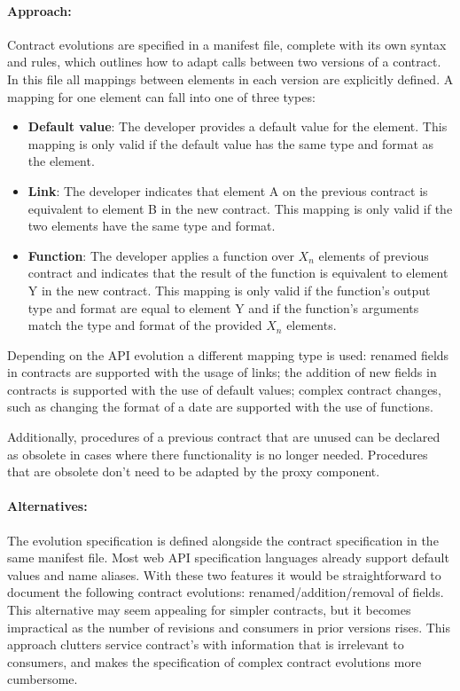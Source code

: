 \paragraph{Approach:}
Contract evolutions are specified in a manifest file, complete with its own syntax and rules,
which outlines how to adapt calls between two versions of a contract.
In this file all mappings between elements in each version are explicitly defined.
A mapping for one element can fall into one of three types:
\begin{itemize}
    \item \textbf{Default value}: The developer provides a default value for the element.
    This mapping is only valid if the default value has the same type and format as the element.
    \item \textbf{Link}: The developer indicates that element A on the previous contract is equivalent to element B in the new contract.
    This mapping is only valid if the two elements have the same type and format.
    \item \textbf{Function}: The developer applies a function over $X_{n}$ elements of previous contract and indicates that the result of the function is equivalent to element Y in the new contract.
    This mapping is only valid if the function's output type and format are equal to element Y and if the function's arguments match the type and format of the provided  $X_{n}$ elements.
\end{itemize}
Depending on the API evolution a different mapping type is used:
renamed fields in contracts are supported with the usage of links;
the addition of new fields in contracts is supported with the use of default values;
complex contract changes, such as changing the format of a date are supported with the use of functions.

Additionally, procedures of a previous contract that are unused can be declared as obsolete in cases where there functionality is no longer needed.
Procedures that are obsolete don't need to be adapted by the proxy component.

\paragraph{Alternatives:}
The evolution specification is defined alongside the contract specification in the same manifest file.
Most web API specification languages already support default values and name aliases.
With these two features it would be straightforward
to document the following contract evolutions: renamed/addition/removal of fields.
This alternative may seem appealing for simpler contracts, but it becomes impractical as the number of revisions and consumers in prior versions rises.
This approach clutters service contract's with information that is irrelevant to consumers, and makes the specification of complex contract evolutions more cumbersome.

